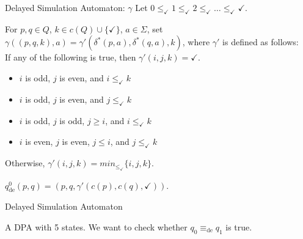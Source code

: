 \begin{frame}{Delayed Simulation Automaton: $\gamma$}
	Let $0 \leq_\checkmark 1 \leq_\checkmark 2 \leq_\checkmark \dots \leq_\checkmark \checkmark$.

	For $p, q \in Q$, $k \in c(Q) \cup \{\checkmark\}$, $a \in \Sigma$, set $\gamma((p, q, k), a) = \gamma'(\delta^*(p, a), \delta^*(q, a), k)$, where $\gamma'$ is defined as follows: \\
	If any of the following is true, then $\gamma'(i, j, k) = \checkmark$.
	
	\begin{itemize}
		\item $i$ is odd, $j$ is even, and $i \leq_\checkmark k$
		\item $i$ is odd, $j$ is even, and $j \leq_\checkmark k$
		\item $i$ is odd, $j$ is odd, $j \geq i$, and $i \leq_\checkmark k$
		\item $i$ is even, $j$ is even, $j \leq i$, and $j \leq_\checkmark k$
	\end{itemize}
	
	Otherwise, $\gamma'(i, j, k) = min_{\leq_\checkmark} \{ i,j,k \}$.
	
	$q_\text{de}^0(p, q) = (p, q, \gamma'(c(p), c(q), \checkmark))$.
\end{frame}


\begin{frame}{Delayed Simulation Automaton}
\begin{figure}
\centering
{}
\end{figure}

A DPA with 5 states. We want to check whether $q_0 \equiv_\text{de} q_1$ is true. 
\end{frame}


